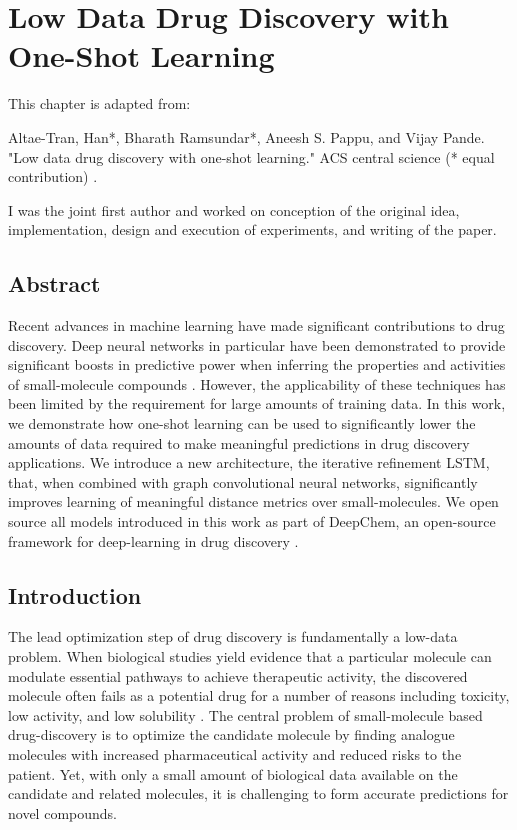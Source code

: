 \section{Low Data Drug Discovery with One-Shot Learning}

This chapter is adapted from: 

Altae-Tran, Han*, Bharath Ramsundar*, Aneesh S. Pappu, and Vijay Pande. "Low data drug discovery with one-shot learning." ACS central science (* equal contribution) \cite{altae2017low}. 

I was the joint first author and worked on conception of the original idea, implementation, design and execution of experiments, and writing of the paper.

\subsection{Abstract}
Recent advances in machine learning have made significant contributions to drug discovery. Deep neural networks in particular have been demonstrated to provide significant boosts in predictive power when inferring the properties and activities of small-molecule compounds \cite{ma2015deep}. However, the applicability of these techniques has been limited by the requirement for large amounts of training data. In this work, we demonstrate how one-shot learning can be used to significantly lower the amounts of data required to make meaningful predictions in drug discovery applications. We introduce a new architecture, the iterative refinement LSTM, that, when combined with graph convolutional neural networks, significantly improves learning of meaningful distance metrics over small-molecules. We open source all models introduced in this work as part of DeepChem, an open-source framework for deep-learning in drug discovery
\cite{ram2016}.

\subsection{Introduction}
The lead optimization step of drug discovery is fundamentally a low-data problem. When biological studies yield evidence that a particular molecule can modulate essential pathways to achieve therapeutic activity, the discovered molecule often fails as a potential drug for a number of reasons including toxicity, low activity, and low solubility \cite{waring2015analysis}. The central problem of small-molecule based drug-discovery is to optimize the candidate molecule by finding analogue molecules with increased pharmaceutical activity and reduced risks to the patient. Yet, with only a small amount of biological data available on the candidate and related molecules, it is challenging to form accurate predictions for novel compounds.

